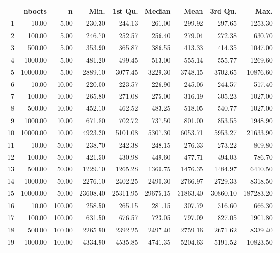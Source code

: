 \begin{table}[ht]
\centering
\begin{tabular}{rrrrrrrrr}
  \hline
 & nboots & n & Min. & 1st Qu. & Median & Mean & 3rd Qu. & Max. \\ 
  \hline
1 & 10.00 & 5.00 & 230.30 & 244.13 & 261.00 & 299.92 & 297.65 & 1253.30 \\ 
  2 & 100.00 & 5.00 & 246.70 & 252.57 & 256.40 & 279.04 & 272.38 & 630.70 \\ 
  3 & 500.00 & 5.00 & 353.90 & 365.87 & 386.55 & 413.33 & 414.35 & 1047.00 \\ 
  4 & 1000.00 & 5.00 & 481.20 & 499.45 & 513.00 & 555.14 & 555.77 & 1269.60 \\ 
  5 & 10000.00 & 5.00 & 2889.10 & 3077.45 & 3229.30 & 3748.15 & 3702.65 & 10876.60 \\ 
  6 & 10.00 & 10.00 & 220.00 & 223.57 & 226.90 & 245.06 & 244.57 & 517.40 \\ 
  7 & 100.00 & 10.00 & 265.80 & 271.08 & 275.00 & 316.19 & 305.23 & 1027.00 \\ 
  8 & 500.00 & 10.00 & 452.10 & 462.52 & 483.25 & 518.05 & 540.77 & 1027.00 \\ 
  9 & 1000.00 & 10.00 & 671.80 & 702.72 & 737.50 & 801.00 & 853.55 & 1948.90 \\ 
  10 & 10000.00 & 10.00 & 4923.20 & 5101.08 & 5307.30 & 6053.71 & 5953.27 & 21633.90 \\ 
  11 & 10.00 & 50.00 & 238.70 & 242.38 & 248.15 & 276.33 & 273.22 & 809.80 \\ 
  12 & 100.00 & 50.00 & 421.50 & 430.98 & 449.60 & 477.71 & 494.03 & 786.70 \\ 
  13 & 500.00 & 50.00 & 1229.10 & 1265.28 & 1360.75 & 1476.35 & 1484.97 & 6410.50 \\ 
  14 & 1000.00 & 50.00 & 2276.10 & 2402.25 & 2490.30 & 2766.97 & 2729.33 & 8318.50 \\ 
  15 & 10000.00 & 50.00 & 23608.40 & 25311.95 & 29675.15 & 31863.40 & 30860.10 & 187283.20 \\ 
  16 & 10.00 & 100.00 & 258.50 & 265.15 & 281.15 & 307.79 & 316.60 & 666.30 \\ 
  17 & 100.00 & 100.00 & 631.50 & 676.57 & 723.05 & 797.09 & 827.05 & 1901.80 \\ 
  18 & 500.00 & 100.00 & 2265.90 & 2392.25 & 2497.40 & 2759.16 & 2671.62 & 8339.40 \\ 
  19 & 1000.00 & 100.00 & 4334.90 & 4535.85 & 4741.35 & 5204.63 & 5191.52 & 10823.50 \\ 

\end{tabular}
\end{table}
